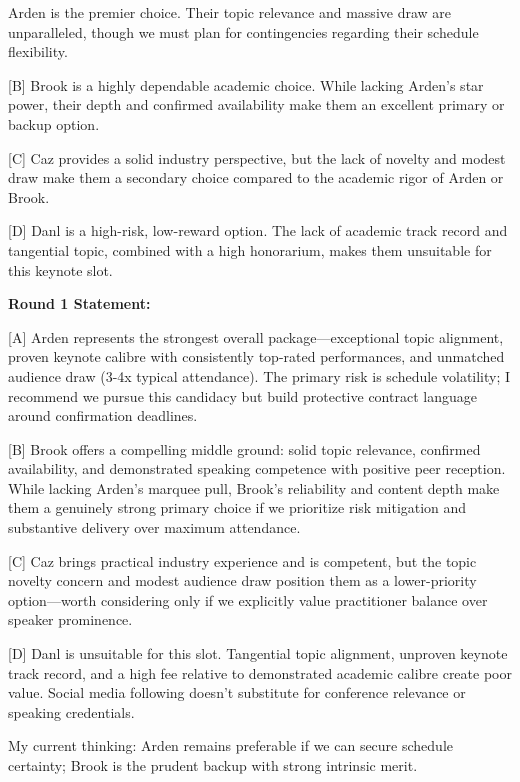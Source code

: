 \documentclass{article}
\begin{document}
\begin{tcolorbox}[mbox-neutral={agent\_4 -- discussion r1}]
[A] Arden is the premier choice. Their topic relevance and massive draw are unparalleled, though we must plan for contingencies regarding their schedule flexibility.

[B] Brook is a highly dependable academic choice. While lacking Arden's star power, their depth and confirmed availability make them an excellent primary or backup option.

[C] Caz provides a solid industry perspective, but the lack of novelty and modest draw make them a secondary choice compared to the academic rigor of Arden or Brook.

[D] Danl is a high-risk, low-reward option. The lack of academic track record and tangential topic, combined with a high honorarium, makes them unsuitable for this keynote slot.
\end{tcolorbox}

\begin{tcolorbox}[mbox-neutral={agent\_2 -- discussion r1}]
\textbf{Round 1 Statement:}

[A] Arden represents the strongest overall package---exceptional topic alignment, proven keynote calibre with consistently top-rated performances, and unmatched audience draw (3-4x typical attendance). The primary risk is schedule volatility; I recommend we pursue this candidacy but build protective contract language around confirmation deadlines.

[B] Brook offers a compelling middle ground: solid topic relevance, confirmed availability, and demonstrated speaking competence with positive peer reception. While lacking Arden's marquee pull, Brook's reliability and content depth make them a genuinely strong primary choice if we prioritize risk mitigation and substantive delivery over maximum attendance.

[C] Caz brings practical industry experience and is competent, but the topic novelty concern and modest audience draw position them as a lower-priority option---worth considering only if we explicitly value practitioner balance over speaker prominence.

[D] Danl is unsuitable for this slot. Tangential topic alignment, unproven keynote track record, and a high fee relative to demonstrated academic calibre create poor value. Social media following doesn't substitute for conference relevance or speaking credentials.

My current thinking: Arden remains preferable if we can secure schedule certainty; Brook is the prudent backup with strong intrinsic merit.
\end{tcolorbox}
\end{document}
